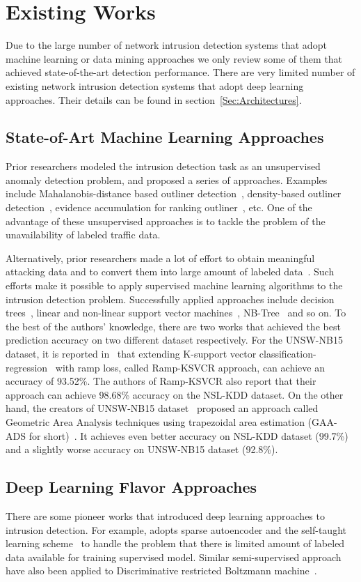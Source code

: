 \section{Existing Works}
Due to the large number of network intrusion detection systems that adopt machine learning or data mining approaches
we only review some of them that achieved state-of-the-art detection performance.
There are very limited number of existing network intrusion detection systems that adopt
deep learning approaches.
Their details can be found in section~\ref{Sec:Architectures}.

\subsection{State-of-Art Machine Learning Approaches}
Prior researchers modeled the intrusion detection task as an unsupervised
anomaly detection problem, and proposed a series of approaches.
Examples include Mahalanobis-distance based outliner detection~\cite{ComparativeAnomalyNIDS},
density-based outliner detection~\cite{LOF, ComparativeAnomalyNIDS},
evidence accumulation for ranking outliner~\cite{RankingOutliner}, etc.
One of the advantage of these unsupervised approaches is to tackle the problem of
the unavailability of labeled traffic data.

Alternatively, prior researchers made a lot of effort to obtain meaningful
attacking data and to convert them into large amount of labeled data~\cite{DARPA, KDDCup, NSL-KDD, UNSW, UNSW1}.
Such efforts make it possible to apply supervised machine learning algorithms to the
intrusion detection problem.
Successfully applied approaches include decision trees~\cite{DecisionTree},
linear and non-linear support vector machines~\cite{SVM}, NB-Tree~\cite{NB-Tree} and so on.
To the best of the authors' knowledge, there are two works that achieved the best prediction
accuracy on two different dataset respectively.
For the UNSW-NB15 dataset, it is reported in~\cite{RampLossKSVCR} that extending K-support vector
classification-regression~\cite{KSVCR} with ramp loss, called Ramp-KSVCR approach, can achieve an accuracy of 93.52\%.
The authors of Ramp-KSVCR also report that their approach can achieve 98.68\% accuracy on the NSL-KDD dataset.
On the other hand, the creators of UNSW-NB15 dataset~\cite{UNSW} proposed an approach called
Geometric Area Analysis techniques using trapezoidal area estimation (GAA-ADS for short)~\cite{GAA-ADS}.
It achieves even better accuracy on NSL-KDD dataset (99.7\%) and a slightly worse accuracy on
UNSW-NB15 dataset (92.8\%).


\subsection{Deep Learning Flavor Approaches}
There are some pioneer works that introduced deep learning approaches to intrusion detection.
For example, \cite{STL-NIDS} adopts sparse autoencoder and the self-taught learning
scheme~\cite{SparseAE} to handle the problem that there is limited amount of labeled data
available for training supervised model.
Similar semi-supervised approach have also been applied to
Discriminative restricted Boltzmann machine~\cite{AnomalyDetectionRBM}.
